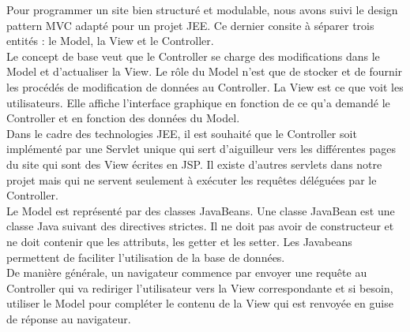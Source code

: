Pour programmer un site bien structuré et modulable, nous avons suivi le 
design pattern MVC adapté pour un projet JEE. Ce dernier consite à séparer trois 
entités : le Model, la View et le Controller. \\

Le concept de base veut que le Controller se charge des modifications dans le 
Model et d'actualiser la View. Le rôle du Model n'est que de stocker et de 
fournir les procédés de modification de données au Controller. La View est ce 
que voit les utilisateurs. Elle affiche l'interface graphique en fonction de ce 
qu'a demandé le Controller et en fonction des données du Model. \\

Dans le cadre des technologies JEE, il est souhaité que le Controller soit 
implémenté par une Servlet unique qui sert d'aiguilleur vers les différentes 
pages du site qui sont des View écrites en JSP. Il existe d'autres servlets 
dans notre projet mais qui ne servent seulement à exécuter les requêtes 
déléguées par le Controller.\\

Le Model est représenté par des classes JavaBeans. Une classe JavaBean est une 
classe Java suivant des directives strictes. Il ne doit pas avoir de 
constructeur et ne doit contenir que les attributs, les getter et les setter. 
Les Javabeans permettent de faciliter l'utilisation de la base de données. \\

De manière générale, un navigateur commence par envoyer une requête au 
Controller qui va rediriger l'utilisateur vers la View correspondante et si 
besoin, utiliser le Model pour compléter le contenu de la View qui est renvoyée 
en guise de réponse au navigateur.

